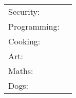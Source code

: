 \documentclass[]{awesome-cv}
\begin{document}
\begin{cventries}
	\cventry
	{}
	{\def\arraystretch{1.15}{\begin{tabular}{ l l }
		Security:  & {\skill{ Hardware, Networks, Binary}} \\
		Programming:  & {\skill{ Firmware development, python automation}} \\
		Cooking:  & {\skill{ Everything}} \\
		Art:  & {\skill{ Painting, Drawing, Portraiture, Photography}} \\
		Maths:  & {\skill{ Shader Maths, Algorithms, Lossless compression}} \\
		Dogs:  & {\skill{ Dogs}} \\
		\end{tabular}}}
	{}
	{}
	{}
\end{cventries}

\ 
\end{document}
